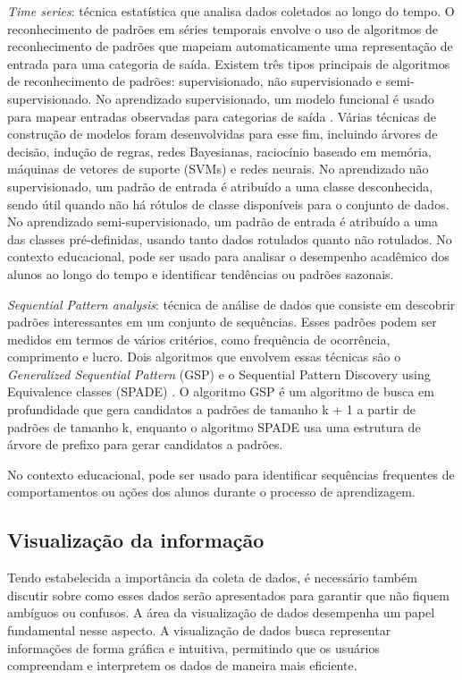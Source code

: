 \begin{enumerate}
{    \item \textit{Time series}: técnica estatística que analisa dados coletados ao longo do tempo. O reconhecimento de padrões em séries temporais envolve o uso de algoritmos de reconhecimento de padrões que mapeiam automaticamente uma representação de entrada para uma categoria de saída. Existem três tipos principais de algoritmos de reconhecimento de padrões: supervisionado, não supervisionado e semi-supervisionado. No aprendizado supervisionado, um modelo funcional é usado para mapear entradas observadas para categorias de saída . Várias técnicas de construção de modelos foram desenvolvidas para esse fim, incluindo árvores de decisão, indução de regras, redes Bayesianas, raciocínio baseado em memória, máquinas de vetores de suporte (SVMs) e redes neurais. No aprendizado não supervisionado, um padrão de entrada é atribuído a uma classe desconhecida, sendo útil quando não há rótulos de classe disponíveis para o conjunto de dados. No aprendizado semi-supervisionado, um padrão de entrada é atribuído a uma das classes pré-definidas, usando tanto dados rotulados quanto não rotulados. \cite{jessica:time} No contexto educacional, pode ser usado para analisar o desempenho acadêmico dos alunos ao longo do tempo e identificar tendências ou padrões sazonais.

    \item \textit{Sequential Pattern analysis}: técnica de análise de dados que consiste em descobrir padrões interessantes em um conjunto de sequências. Esses padrões podem ser medidos em termos de vários critérios, como frequência de ocorrência, comprimento e lucro. Dois algoritmos que envolvem essas técnicas são o \textit{Generalized Sequential Pattern} (GSP) e o Sequential Pattern Discovery using Equivalence classes (SPADE) \cite{FournierViger2017ASO}. O algoritmo GSP é um algoritmo de busca em profundidade que gera candidatos a padrões de tamanho k + 1 a partir de padrões de tamanho k, enquanto o algoritmo SPADE usa uma estrutura de árvore de prefixo para gerar candidatos a padrões.} No contexto educacional, pode ser usado para identificar sequências frequentes de comportamentos ou ações dos alunos durante o processo de aprendizagem. 
\end{enumerate}


\subsection{Visualização da informação}

Tendo estabelecida a importância da coleta de dados, é necessário também discutir sobre como esses dados serão apresentados para garantir que não fiquem ambíguos ou confusos. A área da visualização de dados desempenha um papel fundamental nesse aspecto. A visualização de dados busca representar informações de forma gráfica e intuitiva, permitindo que os usuários compreendam e interpretem os dados de maneira mais eficiente.

